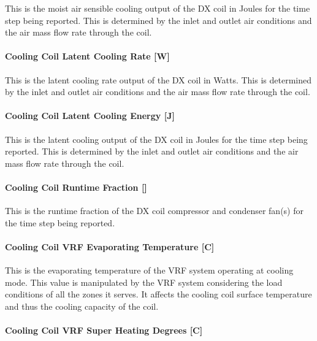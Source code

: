 This is the moist air sensible cooling output of the DX coil in Joules for the time step being reported. This is determined by the inlet and outlet air conditions and the air mass flow rate through the coil.

\paragraph{Cooling Coil Latent Cooling Rate {[}W{]}}\label{cooling-coil-latent-cooling-rate-w-1}

This is the latent cooling rate output of the DX coil in Watts. This is determined by the inlet and outlet air conditions and the air mass flow rate through the coil.

\paragraph{Cooling Coil Latent Cooling Energy {[}J{]}}\label{cooling-coil-latent-cooling-energy-j-1}

This is the latent cooling output of the DX coil in Joules for the time step being reported. This is determined by the inlet and outlet air conditions and the air mass flow rate through the coil.

\paragraph{Cooling Coil Runtime Fraction {[]}}\label{cooling-coil-runtime-fraction-1}

This is the runtime fraction of the DX coil compressor and condenser fan(s) for the time step being reported.

\paragraph{Cooling Coil VRF Evaporating Temperature {[}C{]}}\label{cooling-coil-vrf-evaporating-temperature-c}

This is the evaporating temperature of the VRF system operating at cooling mode. This value is manipulated by the VRF system considering the load conditions of all the zones it serves. It affects the cooling coil surface temperature and thus the cooling capacity of the coil.

\paragraph{Cooling Coil VRF Super Heating Degrees {[}C{]}}\label{cooling-coil-vrf-super-heating-degrees-c}

